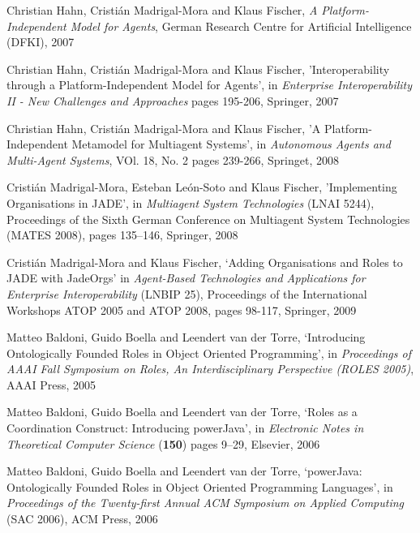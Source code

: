 \begin{thebibliography}{99}

Christian Hahn, Cristián Madrigal-Mora and Klaus Fischer,
\textit{A Platform-Independent Model for Agents},
German Research Centre for Artificial Intelligence (DFKI), 2007

Christian Hahn, Cristián Madrigal-Mora and Klaus Fischer,
'Interoperability through a Platform-Independent Model for Agents',
in \textit{Enterprise Interoperability II - New Challenges and Approaches}
pages 195-206,
Springer, 2007

Christian Hahn, Cristián Madrigal-Mora and Klaus Fischer,
'A Platform-Independent Metamodel for Multiagent Systems',
in \textit{Autonomous Agents and Multi-Agent Systems}, VOl. 18, No. 2
pages 239-266,
Springet, 2008

Cristián Madrigal-Mora, Esteban León-Soto and Klaus Fischer,
'Implementing Organisations in JADE',
in \textit{Multiagent System Technologies} (LNAI 5244),
Proceedings of the Sixth German Conference on Multiagent System Technologies (MATES 2008),
pages 135–146,
Springer, 2008

Cristián Madrigal-Mora and Klaus Fischer,
`Adding Organisations and Roles to JADE with JadeOrgs'
in \textit{Agent-Based Technologies and Applications for Enterprise Interoperability} (LNBIP 25),
Proceedings of the International Workshops ATOP 2005 and ATOP 2008,
pages 98-117,
Springer, 2009


Matteo Baldoni, Guido Boella and Leendert van der Torre,
`Introducing Ontologically Founded Roles in Object Oriented Programming',
in \textit{Proceedings of AAAI Fall Symposium on Roles, An Interdisciplinary Perspective (ROLES 2005)},
AAAI Press, 2005

Matteo Baldoni, Guido Boella and Leendert van der Torre,
`Roles as a Coordination Construct: Introducing powerJava',
in \textit{Electronic Notes in Theoretical Computer Science} (\textbf{150})
pages 9–29,
Elsevier, 2006

Matteo Baldoni, Guido Boella and Leendert van der Torre,
`powerJava: Ontologically Founded Roles in Object Oriented Programming Languages',
in \textit{Proceedings of the Twenty-first Annual ACM Symposium on Applied Computing} (SAC 2006),
ACM Press, 2006


\end{thebibliography}
